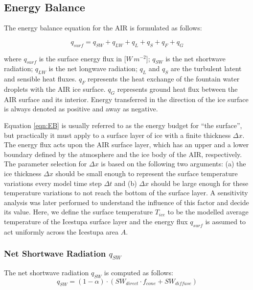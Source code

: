 \documentclass[utf8]{frontiersSCNS} %
\begin{document}
\subsection{Energy Balance} \label{section:EB}

The energy balance equation \citep{Hock_2005} for the AIR is formulated as follows:

\begin{equation} q_{surf} = q_{SW} + q_{LW} + q_{L} + q_{S} + q_{F} + q_{G}\label{eqn:EB} \end{equation}

where $q_{surf}$ is the surface energy flux in [$W\,m^{-2}$]; $q_{SW}$ is the net shortwave radiation; $q_{LW}$ is the
net longwave radiation; $q_{L}$ and $q_{S}$ are the turbulent latent and sensible heat fluxes. $q_{F}$ represents the
heat exchange of the fountain water droplets with the AIR ice surface. $q_{G}$ represents ground heat flux between the
AIR surface and its interior. Energy transferred in the direction of the ice surface is always denoted as positive and
away as negative.

Equation \ref{eqn:EB} is usually referred to as the energy budget for “the surface”, but practically it must apply to a
surface layer of ice with a finite thickness $\Delta x$. The energy flux acts upon the AIR surface layer, which has an
upper and a lower boundary defined by the atmosphere and the ice body of the AIR, respectively. The parameter selection
for $\Delta x$ is based on the following two arguments: (a) the ice thickness $\Delta x$ should be small enough to
represent the surface temperature variations every model time step $\Delta t$ and (b) $\Delta x$ should be large enough
for these temperature variations to not reach the bottom of the surface layer. A sensitivity analysis was later
performed to understand the influence of this factor and decide its value. Here, we define the surface temperature
$T_{ice}$ to be the modelled average temperature of the Icestupa surface layer and the energy flux $q_{surf}$ is assumed
to act uniformly across the Icestupa area $A$.

\subsubsection{Net Shortwave Radiation \texorpdfstring{$q_{SW}$}{Lg}}
The net shortwave radiation $q_{SW}$ is computed as follows:
\begin{equation} q_{SW} = (1- \alpha)\cdot (SW_{direct} \cdot f_{cone} + SW_{diffuse}) \label{eqn:SW} \end{equation}
\end{document}
